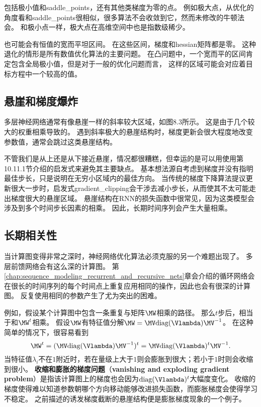 
包括极小值和\gls{saddle_points}，还有其他类梯度为零的点。
例如极大点，从优化的角度看和\gls{saddle_points}很相似，很多算法不会收敛到它，然而未修改的牛顿法会。
和极小点一样，极大点在高维空间中也是指数级稀少。

也可能会有恒值的宽而平坦区间。
在这些区间，梯度和\gls{hessian}矩阵都是零。
这种退化的情形是所有数值优化算法的主要问题。
在凸问题中，一个宽而平的区间肯定包含全局极小值，但是对于一般的优化问题而言，
这样的区域可能会对应着目标方程中一个较高的值。


\subsection{悬崖和梯度爆炸}
\label{sec:cliffs_and_exploding_gradients}
多层神经网络通常有像悬崖一样的斜率较大区域，如图8.3所示。
这是由于几个较大的权重相乘导致的。
遇到斜率极大的悬崖结构时，梯度更新会很大程度地改变参数值，通常会跳过这类悬崖结构。

不管我们是从上还是从下接近悬崖，情况都很糟糕，但幸运的是可以用使用第10.11.1节介绍的启发式来避免其主要缺点。
基本想法源自考虑到梯度并没有指明最佳步长，只是说明在无穷小区域内的最佳方向。
当传统的梯度下降算法提议更新很大一步时，启发式\gls{gradient_clipping}会干涉去减小步长，从而使其不太可能走出梯度很大的悬崖区域。
悬崖结构在\gls{RNN}的损失函数中很常见，因为这类模型会涉及到多个时间步长因素的相乘。
因此，长期时间序列会产生大量相乘。

\subsection{长期相关性}
\label{sec:long_term_dependencies}
当计算图变得非常之深时，神经网络优化算法必须克服的另一个难题出现了。
多层前馈网络会有这么深的计算图。
第\ref{chap:sequence_modeling_recurrent_and_recursive_nets}章会介绍的循环网络会在很长的时间序列的每个时间点上重复应用相同的操作，因此也会有很深的计算图。
反复使用相同的参数产生了尤为突出的困难。


例如，假设某个计算图中包含一条重复与矩阵$\MW$相乘的路径。
那么$t$步后，相当于和$\MW^t$相乘。
假设$\MW$有特征值分解$\MW = \MV \text{diag}(\Vlambda) \MV^{-1}$。
在这种简单的情况下，很容易看到
\begin{equation}
  \MW^t = (\MV \text{diag}(\Vlambda) \MV^{-1})^t = \MV\text{diag}(\Vlambda)^t  \MV^{-1}.
\end{equation}
当特征值$\lambda_i$不在$1$附近时，若在量级上大于$1$则会膨胀到很大；若小于$1$时则会收缩到很小。
\textbf{收缩和膨胀的梯度问题}（\textbf{vanishing and exploding gradient problem}）是指该计算图上的梯度也会因为$\text{diag}(\Vlambda)^t$大幅度变化。
收缩的梯度使得难以知道参数朝哪个方向移动能够改进损失函数，而膨胀梯度会使得学习不稳定。
之前描述的诱发梯度截断的悬崖结构便是膨胀梯度现象的一个例子。

